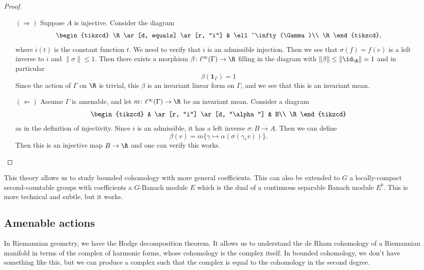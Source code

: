 \documentclass[a4paper]{article}
\begin{document}
\begin{proof}\leavevmode
  \begin{itemize}
    \item[$(\Rightarrow)$] Suppose $A$ is injective. Consider the diagram
      \[
        \begin{tikzcd}
          \R \ar[d, equals] \ar[r, "i"] & \ell^\infty(\Gamma)\\
          \R
        \end{tikzcd},
      \]
      where $i(t)$ is the constant function $t$. We need to verify that $i$ is an admissible injection. Then we see that $\sigma(f) = f(e)$ is a left inverse to $i$ and $\|\sigma\| \leq 1$. Then there exists a morphism $\beta\colon \ell^\infty(\Gamma) \to \R$ filling in the diagram with $\|\beta\| \leq \|\id_\R\| = 1$ and in particular
      \[
        \beta(\mathbf{1}_\Gamma) = 1
      \]
      Since the action of $\Gamma$ on $\R$ is trivial, this $\beta$ is an invariant linear form on $\Gamma$, and we see that this is an invariant mean.
    \item[$(\Leftarrow)$] Assume $\Gamma$ is amenable, and let $m\colon \ell^\infty(\Gamma) \to \R$ be an invariant mean. Consider a diagram
      \[
        \begin{tikzcd}
          A \ar[r, "i"] \ar[d, "\alpha"] & B\\
          \R
        \end{tikzcd}
      \]
      as in the definition of injectivity. Since $i$ is an admissible, it has a left inverse $\sigma\colon B \to A$. Then we can define
      \[
        \beta(v) = m \{\gamma \mapsto \alpha(\sigma(\gamma_* v))\}.
      \]
      Then this is an injective map $B \to \R$ and one can verify this works.
  \end{itemize}
\end{proof}

This theory allows us to study bounded cohomology with more general coefficients. This can also be extended to $G$ a locally-compact second-countable groups with coefficients a $G$-Banach module $E$ which is the dual of a continuous separable Banach module $E^b$. This is more technical and subtle, but it works.

\subsection{Amenable actions}
In Riemannian geometry, we have the Hodge decomposition theorem. It allows us to understand the de Rham cohomology of a Riemannian manifold in terms of the complex of harmonic forms, whose cohomology is the complex itself. In bounded cohomology, we don't have something like this, but we can produce a complex such that the complex is equal to the cohomology in the second degree.
\end{document}
